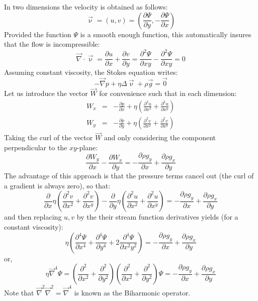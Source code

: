 In two dimensions the velocity is obtained as follows:
\begin{equation}
{\vec \upnu} = (u,v) = \left( \frac{\partial \Psi}{\partial y},-\frac{\partial \Psi}{\partial x} \right) 
\end{equation}
Provided the function $\Psi$ is a smooth enough function, 
this automatically insures that the flow is incompressible:
\begin{equation}
{\vec \nabla}\cdot {\vec \upnu} = 
\frac{\partial u}{\partial x} + \frac{\partial v}{\partial y}
=
\frac{\partial^2 \Psi}{\partial xy} - \frac{\partial^2 \Psi}{\partial xy} =0 
\end{equation}
Assuming constant viscosity, the Stokes equation writes:
\begin{equation}
-{\vec \nabla}p + \eta \Delta {\vec \upnu} + \rho {\vec g} = \vec{0}
\end{equation}
Let us introduce the vector ${\vec{W}}$ for convenience such that in each dimension:
\begin{eqnarray}
W_x&=&-\frac{\partial p}{\partial x} 
+ \eta\left( \frac{\partial^2 u}{\partial x^2} + \frac{\partial^2 u}{\partial x^y} \right) \\
W_y&=&-\frac{\partial p}{\partial y} 
+ \eta \left(\frac{\partial^2 v}{\partial x^2} + \frac{\partial^2 v}{\partial x^y} \right) 
\end{eqnarray}
Taking the curl of the vector ${\vec{W}}$ and only considering the component perpendicular to the $xy$-plane:
\begin{equation}
\frac{\partial W_y}{\partial x} - \frac{\partial W_x}{\partial y}  = 
-\frac{\partial \rho g_y}{\partial x} + \frac{\partial \rho g_x}{\partial y}   
\end{equation}
The advantage of this approach is that the pressure terms cancel out (the curl of a gradient is always zero), 
so that:
\begin{equation}
\frac{\partial}{\partial x}\eta\left( \frac{\partial^2 v}{\partial x^2} + \frac{\partial^2 v}{\partial x^y}  \right) 
- \frac{\partial }{\partial y} \eta \left( \frac{\partial^2 u}{\partial x^2} + \frac{\partial^2 u}{\partial x^y} \right) = 
-\frac{\partial \rho g_y}{\partial x} + \frac{\partial \rho g_x}{\partial y}   
\end{equation}
and then replacing $u,v$ by the their stream function derivatives yields (for a constant viscosity):
\begin{equation}
\eta \left(\frac{\partial^4 \Psi}{\partial x^4} + 
\frac{\partial^4 \Psi}{\partial y^4} + 
2\frac{\partial^4 \Psi}{\partial x^2y^2} \right)
=
-\frac{\partial \rho g_y}{\partial x} + \frac{\partial \rho g_x}{\partial y}   
\end{equation}
or, 
\begin{equation}
\eta {\vec \nabla}^4 \Psi 
=
\left(\frac{\partial^2 }{\partial x^2} + \frac{\partial^2 }{\partial y^2} \right) 
\left(\frac{\partial^2 }{\partial x^2} + \frac{\partial^2 }{\partial y^2} \right) \Psi
=
-\frac{\partial \rho g_y}{\partial x} + \frac{\partial \rho g_x}{\partial y}   
\label{eq:sf1}
\end{equation}
Note that $\vec\nabla^2 \vec\nabla^2 = \vec\nabla^4 $ is known as the Biharmonic operator.

